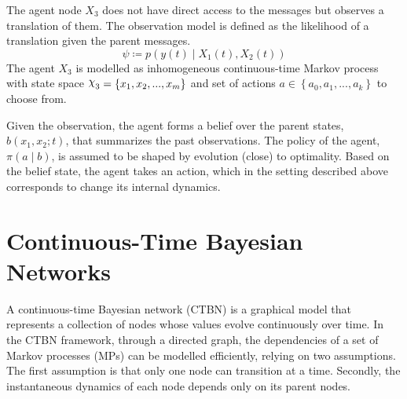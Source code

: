 The agent node $ X_3 $ does not have direct access to the messages but observes a translation of them. The observation model is defined as the likelihood of a translation given the parent messages.
\begin{equation}
\psi \coloneqq p(y(t) \mid X_{1}(t), X_{2}(t))
\end{equation}
The agent  $ X_{3} $ is modelled as inhomogeneous continuous-time Markov process with state space $ \rchi_{3} = \left\lbrace x_{1}, x_{2}, ..., x_{m} \right\rbrace  $ and set of actions $ a \in \left\lbrace a_{0}, a_{1}, ..., a_{k}\right\rbrace  $ to choose from. 

Given the observation, the agent forms a belief over the parent states, $  b(x_{1}, x_{2}; t) $, that summarizes the past observations. The policy of the agent, $ \pi(a \mid b) $, is assumed to be shaped by evolution (close) to optimality. Based on the belief state, the agent takes an action, which in the setting described above corresponds to change its internal dynamics. 
\section{Continuous-Time Bayesian Networks}
A continuous-time Bayesian network (CTBN) is a graphical model that represents a collection of nodes whose values evolve continuously over time. In the CTBN framework, through a directed graph, the dependencies of a set of Markov processes (MPs) can be modelled efficiently, relying on two assumptions. The first assumption is that only one node can transition at a time. Secondly, the instantaneous dynamics of each node depends only on its parent nodes. \cite{Cohn2010a, Nodelman1995} 
